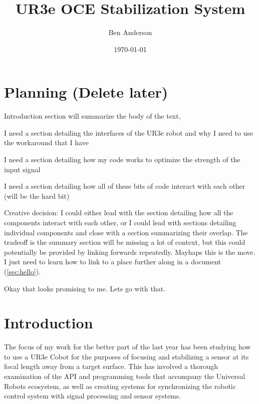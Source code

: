 \documentclass[11pt]{article}
\date{\today}
\title{}
\begin{document}

\newcommand\connect[2]{\path[draw,arrow] (#1) |- ($(#1)!1/2!(#2)$) -| (#2)}

\author{Ben Anderson}
\title{UR3e OCE Stabilization System}
\maketitle
\tableofcontents
\parskip=6pt

\section{Planning (Delete later)}
Introduction section will summarize the body of the text,

I need a section detailing the interfaces of the UR3e robot and why I need to use the workaround that I have

I need a section detailing how my code works to optimize the strength of the input signal

I need a section detailing how all of these bits of code interact with each other (will be the hard bit)

Creative decision: I could either lead with the section detailing how all the components interact with each other, or I could lead with sections detailing individual components and close with a section summarizing their overlap. The tradeoff is the summary section will be missing a lot of context, but this could potentially be provided by linking forwards repeatedly. Mayhaps this is the move. I just need to learn how to link to a place further along in a document (\autoref{sec:hello}).

Okay that looks promising to me. Lets go with that.

\section{Introduction}\label{sec:hello}

The focus of my work for the better part of the last year has been studying how to use a UR3e Cobot for the purposes of focusing and stabilizing a sensor at its focal length away from a target surface. This has involved a thorough examination of the API and programming tools that accompany the Universal Robots ecosystem, as well as creating systems for synchronizing the robotic control system with signal processing and sensor systems.
\end{document}
